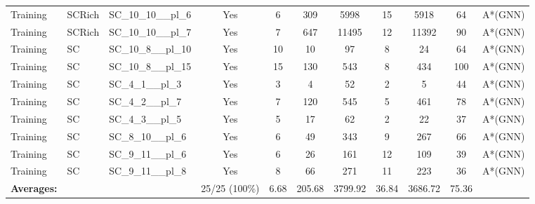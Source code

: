 \documentclass{article}
\begin{document}
\begin{tabular}{lllcccccccc}
Training & SCRich & SC\_10\_10\_\_pl\_6 & Yes & 6 & 309 & 5998 & 15 & 5918 & 64 & A*(GNN) \\
Training & SCRich & SC\_10\_10\_\_pl\_7 & Yes & 7 & 647 & 11495 & 12 & 11392 & 90 & A*(GNN) \\
Training & SC & SC\_10\_8\_\_pl\_10 & Yes & 10 & 10 & 97 & 8 & 24 & 64 & A*(GNN) \\
Training & SC & SC\_10\_8\_\_pl\_15 & Yes & 15 & 130 & 543 & 8 & 434 & 100 & A*(GNN) \\
Training & SC & SC\_4\_1\_\_pl\_3 & Yes & 3 & 4 & 52 & 2 & 5 & 44 & A*(GNN) \\
Training & SC & SC\_4\_2\_\_pl\_7 & Yes & 7 & 120 & 545 & 5 & 461 & 78 & A*(GNN) \\
Training & SC & SC\_4\_3\_\_pl\_5 & Yes & 5 & 17 & 62 & 2 & 22 & 37 & A*(GNN) \\
Training & SC & SC\_8\_10\_\_pl\_6 & Yes & 6 & 49 & 343 & 9 & 267 & 66 & A*(GNN) \\
Training & SC & SC\_9\_11\_\_pl\_6 & Yes & 6 & 26 & 161 & 12 & 109 & 39 & A*(GNN) \\
Training & SC & SC\_9\_11\_\_pl\_8 & Yes & 8 & 66 & 271 & 11 & 223 & 36 & A*(GNN) \\
\textbf{Averages:} & & & 25/25 (100\%) & 6.68 & 205.68 & 3799.92 & 36.84 & 3686.72 & 75.36 & \\
\bottomrule
\end{tabular}
\newpage
\end{document}
